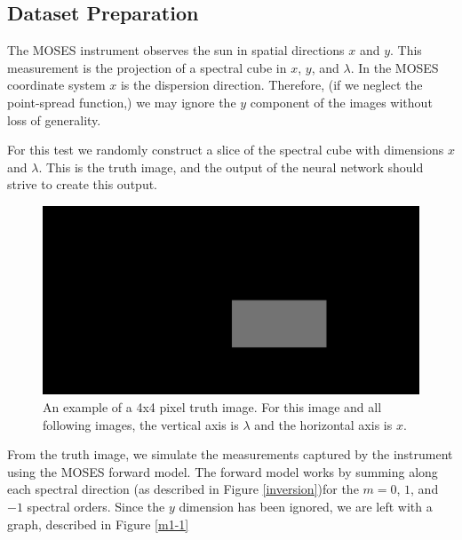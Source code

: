 \documentclass[twoside]{article}
\begin{document}
\begin{multicols}{2}
\subsection{Dataset Preparation}
The MOSES instrument observes the sun in spatial directions $x$ and $y$. This measurement is the projection of a spectral cube in $x$, $y$, and $\lambda$. In the MOSES coordinate system $x$ is the dispersion direction. Therefore, (if we neglect the point-spread function,) we may ignore the $y$ component of the images without loss of generality. \par For this test we randomly construct a slice of the spectral cube with dimensions $x$ and $\lambda$. This is the truth image, and the output of the neural network should strive to create this output. 
\begin{figure}[H]  
	\centering
	 \includegraphics[width=0.75\linewidth]{images/mIn}
	 \caption{An example of a 4x4 pixel truth image. For this image and all following images, the vertical axis is $\lambda$ and the horizontal axis is $x$.}
	 \label{mIn}
\end{figure}
From the truth image, we simulate the measurements captured by the instrument using the MOSES forward model. The forward model works by summing along each spectral direction (as described in Figure \ref{inversion})for the $m=0$, $1$, and $-1$ spectral orders. Since the $y$ dimension has been ignored, we are left with a graph, described in Figure \ref{m1-1}
 

\end{multicols}
\end{document}
